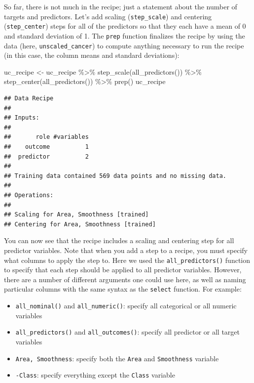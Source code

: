 \documentclass[
]{krantz}
\makeatletter
\newenvironment{Shaded}{\begin{snugshade}}{\end{snugshade}}
\newcommand{\FunctionTok}[1]{\textcolor[rgb]{0,0,0}{#1}}
\newcommand{\NormalTok}[1]{#1}
\newcommand{\OtherTok}[1]{\textcolor[rgb]{0.37,0.37,0.37}{#1}}
\newcommand{\SpecialCharTok}[1]{\textcolor[rgb]{0,0,0}{#1}}
\providecommand{\tightlist}{%
  \setlength{\itemsep}{0pt}\setlength{\parskip}{0pt}}
\newenvironment{kframe}{%
\medskip{}
\setlength{\fboxsep}{.8em}
 \def\at@end@of@kframe{}%
 \ifinner\ifhmode%
  \def\at@end@of@kframe{\end{minipage}}%
  \begin{minipage}{\columnwidth}%
 \fi\fi%
 \def\FrameCommand##1{\hskip\@totalleftmargin \hskip-\fboxsep
 \colorbox{shadecolor}{##1}\hskip-\fboxsep
     \hskip-\linewidth \hskip-\@totalleftmargin \hskip\columnwidth}%
 \MakeFramed {\advance\hsize-\width
   \@totalleftmargin\z@ \linewidth\hsize
   \@setminipage}}%
 {\par\unskip\endMakeFramed%
 \at@end@of@kframe}
\renewenvironment{Shaded}{\begin{kframe}}{\end{kframe}}
\makeatother
\begin{document}
So far, there is not much in the recipe; just a statement about the number of targets
and predictors. Let's add scaling (\texttt{step\_scale}) and centering (\texttt{step\_center}) steps for
all of the predictors so that they each have a mean of 0 and standard deviation of 1.
The \texttt{prep} function finalizes the recipe by using the data (here, \texttt{unscaled\_cancer})
to compute anything necessary to run the recipe (in this case, the column means and standard
deviations):

\begin{Shaded}
\begin{Highlighting}[]
\NormalTok{uc\_recipe }\OtherTok{\textless{}{-}}\NormalTok{ uc\_recipe }\SpecialCharTok{\%\textgreater{}\%}
  \FunctionTok{step\_scale}\NormalTok{(}\FunctionTok{all\_predictors}\NormalTok{()) }\SpecialCharTok{\%\textgreater{}\%}
  \FunctionTok{step\_center}\NormalTok{(}\FunctionTok{all\_predictors}\NormalTok{()) }\SpecialCharTok{\%\textgreater{}\%}
  \FunctionTok{prep}\NormalTok{()}
\NormalTok{uc\_recipe}
\end{Highlighting}
\end{Shaded}

\begin{verbatim}
## Data Recipe
## 
## Inputs:
## 
##       role #variables
##    outcome          1
##  predictor          2
## 
## Training data contained 569 data points and no missing data.
## 
## Operations:
## 
## Scaling for Area, Smoothness [trained]
## Centering for Area, Smoothness [trained]
\end{verbatim}

You can now see that the recipe includes a scaling and centering step for all predictor variables.
Note that when you add a step to a recipe, you must specify what columns to apply the step to.
Here we used the \texttt{all\_predictors()} function to specify that each step should be applied to
all predictor variables. However, there are a number of different arguments one could use here,
as well as naming particular columns with the same syntax as the \texttt{select} function.
For example:

\begin{itemize}
\tightlist
\item
  \texttt{all\_nominal()} and \texttt{all\_numeric()}: specify all categorical or all numeric variables
\item
  \texttt{all\_predictors()} and \texttt{all\_outcomes()}: specify all predictor or all target variables
\item
  \texttt{Area,\ Smoothness}: specify both the \texttt{Area} and \texttt{Smoothness} variable
\item
  \texttt{-Class}: specify everything except the \texttt{Class} variable
\end{itemize}
\end{document}
